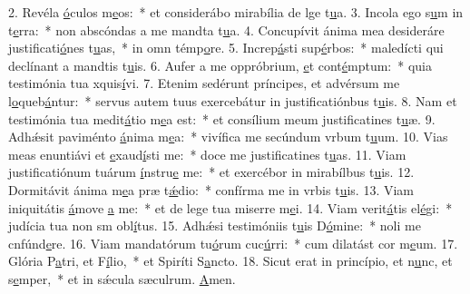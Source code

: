 2. Revéla \uline{ó}culos m\uline{e}os:~* et considerábo mirabília de lge t\uline{u}a.
3. Incola ego s\uline{u}m in t\uline{e}rra:~* non abscóndas a me mandta t\uline{u}a.
4. Concupívit ánima mea desideráre justificati\uline{ó}nes t\uline{u}as,~* in omn témp\uline{o}re.
5. Increp\uline{á}sti sup\uline{é}rbos:~* maledícti qui declínant a mandtis t\uline{u}is.
6. Aufer a me oppróbrium, \uline{e}t cont\uline{é}mptum:~* quia testimónia tua xquis\uline{í}vi.
7. Etenim sedérunt príncipes, et advérsum me l\uline{o}queb\uline{á}ntur:~* servus autem tuus exercebátur in justificatiónbus t\uline{u}is.
8. Nam et testimónia tua medit\uline{á}tio m\uline{e}a est:~* et consílium meum justificatines t\uline{u}æ.
9. Adhǽsit paviménto \uline{á}nima m\uline{e}a:~* vivífica me secúndum vrbum t\uline{u}um.
10. Vias meas enuntiávi et \uline{e}xaud\uline{í}sti me:~* doce me justificatines t\uline{u}as.
11. Viam justificatiónum tuárum \uline{í}nstru\uline{e} me:~* et exercébor in mirabílbus t\uline{u}is.
12. Dormitávit ánima m\uline{e}a præ t\uline{ǽ}dio:~* confírma me in vrbis t\uline{u}is.
13. Viam iniquitátis \uline{á}move \uline{a} me:~* et de lege tua miserre m\uline{e}i.
14. Viam verit\uline{á}tis el\uline{é}gi:~* judícia tua non sm obl\uline{í}tus.
15. Adhǽsi testimóniis t\uline{u}is D\uline{ó}mine:~* noli me cnfúnd\uline{e}re.
16. Viam mandatórum tu\uline{ó}rum cuc\uline{ú}rri:~* cum dilatást cor m\uline{e}um.
17. Glória P\uline{a}tri, et F\uline{í}lio,~* et Spiríti S\uline{a}ncto.
18. Sicut erat in princípio, et n\uline{u}nc, et s\uline{e}mper,~* et in sǽcula sæculrum. \uline{A}men.

